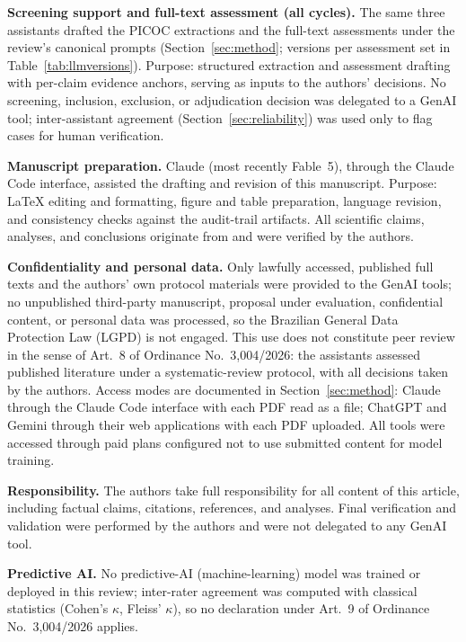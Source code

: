 \documentclass{ieeeaccess}
\begin{document}
\textbf{Screening support and full-text assessment (all cycles).} The
same three assistants drafted the PICOC extractions and the full-text
assessments under the review's canonical prompts
(Section~\ref{sec:method}; versions per assessment set in
Table~\ref{tab:llmversions}). Purpose: structured extraction and
assessment drafting with per-claim evidence anchors, serving as inputs
to the authors' decisions. No screening, inclusion, exclusion, or
adjudication decision was delegated to a GenAI tool; inter-assistant
agreement (Section~\ref{sec:reliability}) was used only to flag cases
for human verification.

\textbf{Manuscript preparation.} Claude (most recently Fable~5),
through the Claude Code interface, assisted the drafting and revision
of this manuscript. Purpose: \LaTeX{} editing and formatting, figure
and table preparation, language revision, and consistency checks
against the audit-trail artifacts. All scientific claims, analyses,
and conclusions originate from and were verified by the authors.

\textbf{Confidentiality and personal data.} Only lawfully accessed,
published full texts and the authors' own protocol materials were
provided to the GenAI tools; no unpublished third-party manuscript,
proposal under evaluation, confidential content, or personal data was
processed, so the Brazilian General Data Protection Law (LGPD) is not
engaged. This use does not constitute peer review in the sense of
Art.~8 of Ordinance No.~3{,}004/2026: the assistants assessed published
literature under a systematic-review protocol, with all decisions taken
by the authors. Access modes are documented in
Section~\ref{sec:method}: Claude through the Claude Code interface with
each PDF read as a file; ChatGPT and Gemini through their web
applications with each PDF uploaded. All tools were accessed through
paid plans configured not to use submitted content for model training.

\textbf{Responsibility.} The authors take full responsibility for all
content of this article, including factual claims, citations,
references, and analyses. Final verification and validation were
performed by the authors and were not delegated to any GenAI tool.

\textbf{Predictive AI.} No predictive-AI (machine-learning) model was
trained or deployed in this review; inter-rater agreement was computed
with classical statistics (Cohen's $\kappa$, Fleiss' $\kappa$), so no
declaration under Art.~9 of Ordinance No.~3{,}004/2026 applies.
\end{document}
